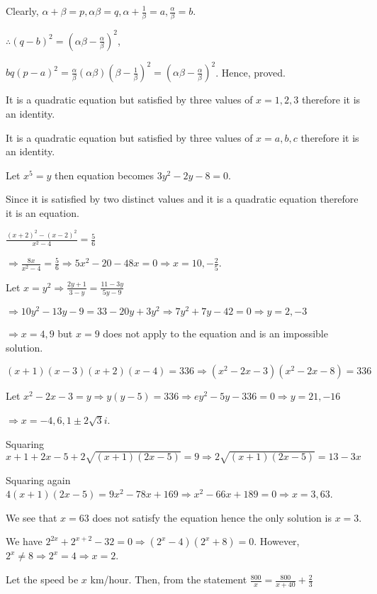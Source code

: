   Clearly, $\alpha + \beta = p, \alpha\beta = q, \alpha + \frac{1}{\beta} = a, \frac{\alpha}{\beta} = b$.

  $\therefore (q - b)^2 = (\alpha\beta - \frac{\alpha}{\beta})^2$,

  $bq(p - a)^2 = \frac{\alpha}{\beta}(\alpha\beta)(\beta - \frac{1}{\beta})^2 = (\alpha\beta -
  \frac{\alpha}{\beta})^2$. Hence, proved.
\item It is a quadratic equation but satisfied by three values of $x = 1, 2, 3$ therefore it is an
  identity.
\item It is a quadratic equation but satisfied by three values of $x = a, b, c$ therefore it is an
  identity.
\item Let $x^5 = y$ then equation becomes $3y^2 - 2y - 8 = 0$.

  Since it is satisfied by two distinct values and it is a quadratic equation therefore it is an
  equation.
\item $\frac{(x + 2)^2 - (x - 2)^2}{x^2 - 4} = \frac{5}{6}$

  $\Rightarrow \frac{8x}{x^2 - 4} = \frac{5}{6}\Rightarrow 5x^2 - 20 - 48x = 0\Rightarrow x = 10 ,
  -\frac{2}{5}$.
\item Let $x = y^2\Rightarrow \frac{2y + 1}{3 - y} = \frac{11 - 3y}{5y - 9}$

  $\Rightarrow 10y^2 - 13y - 9 = 33 - 20y + 3y^2\Rightarrow 7y^2 + 7y - 42 = 0\Rightarrow y = 2, -3$

  $\Rightarrow x = 4, 9$ but $x = 9$ does not apply to the equation and is an impossible solution.
\item $(x + 1)(x - 3)(x + 2)(x - 4) = 336\Rightarrow (x^2 - 2x - 3)(x^2 - 2x - 8) = 336$

  Let $x^2 - 2x - 3 = y\Rightarrow y(y - 5) = 336\Rightarrow ey^2 - 5y - 336 = 0\Rightarrow y = 21, -16$

  $\Rightarrow x = -4, 6, 1 \pm 2\sqrt{3}i$.
\item Squaring $x + 1 + 2x - 5 + 2\sqrt{(x + 1)(2x - 5)} = 9 \Rightarrow 2\sqrt{(x + 1)(2x - 5)} = 13 - 3x$

  Squaring again $4(x + 1)(2x - 5) = 9x^2 - 78x + 169 \Rightarrow x^2 - 66x + 189 = 0\Rightarrow x = 3, 63$.

  We see that $x = 63$ does not satisfy the equation hence the only solution is $x = 3$.
\item We have $2^{2x} + 2^{x + 2} - 32 = 0\Rightarrow (2^x - 4)(2^x + 8) = 0$. However, $2^x \neq
  8\Rightarrow 2^x = 4 \Rightarrow x = 2$.
\item Let the speed be $x$ km/hour. Then, from the statement $\frac{800}{x} = \frac{800}{x + 40} + \frac{2}{3}$

